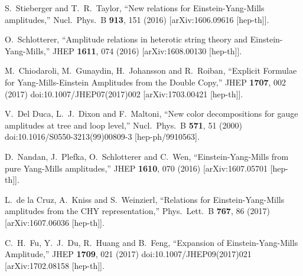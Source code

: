 \documentclass[11pt,a4paper]{article}
\begin{document}
\begin{thebibliography}{}


  S.~Stieberger and T.~R.~Taylor,
  ``New relations for Einstein-Yang-Mills amplitudes,''
  Nucl.\ Phys.\ B {\bf 913}, 151 (2016)
  [arXiv:1606.09616 [hep-th]].


  O.~Schlotterer,
  ``Amplitude relations in heterotic string theory and Einstein-Yang-Mills,''
  JHEP {\bf 1611}, 074 (2016)
  [arXiv:1608.00130 [hep-th]].


  M.~Chiodaroli, M.~Gunaydin, H.~Johansson and R.~Roiban,
  ``Explicit Formulae for Yang-Mills-Einstein Amplitudes from the Double Copy,''
  JHEP {\bf 1707}, 002 (2017)
  doi:10.1007/JHEP07(2017)002
  [arXiv:1703.00421 [hep-th]].

  V.~Del Duca, L.~J.~Dixon and F.~Maltoni,
  ``New color decompositions for gauge amplitudes at tree and loop level,''
  Nucl.\ Phys.\ B {\bf 571}, 51 (2000)
  doi:10.1016/S0550-3213(99)00809-3
  [hep-ph/9910563].


  D.~Nandan, J.~Plefka, O.~Schlotterer and C.~Wen,
  ``Einstein-Yang-Mills from pure Yang-Mills amplitudes,''
  JHEP {\bf 1610}, 070 (2016)
  [arXiv:1607.05701 [hep-th]].


  L.~de la Cruz, A.~Kniss and S.~Weinzierl,
  ``Relations for Einstein-Yang-Mills amplitudes from the CHY representation,''
  Phys.\ Lett.\ B {\bf 767}, 86 (2017)
  [arXiv:1607.06036 [hep-th]].

  C.~H.~Fu, Y.~J.~Du, R.~Huang and B.~Feng,
  ``Expansion of Einstein-Yang-Mills Amplitude,''
  JHEP {\bf 1709}, 021 (2017)
  doi:10.1007/JHEP09(2017)021
  [arXiv:1702.08158 [hep-th]].



\end{thebibliography}
\end{document}
